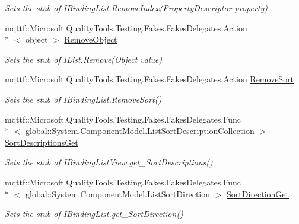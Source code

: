 \begin{DoxyCompactItemize}
\begin{DoxyCompactList}\small\item\em Sets the stub of I\-Binding\-List.\-Remove\-Index(\-Property\-Descriptor property)\end{DoxyCompactList}\item 
mqttf\-::\-Microsoft.\-Quality\-Tools.\-Testing.\-Fakes.\-Fakes\-Delegates.\-Action\\*
$<$ object $>$ \hyperlink{class_system_1_1_component_model_1_1_fakes_1_1_stub_i_binding_list_view_a52741de6b144fa468048a244bdeb375b}{Remove\-Object}
\begin{DoxyCompactList}\small\item\em Sets the stub of I\-List.\-Remove(\-Object value)\end{DoxyCompactList}\item 
mqttf\-::\-Microsoft.\-Quality\-Tools.\-Testing.\-Fakes.\-Fakes\-Delegates.\-Action \hyperlink{class_system_1_1_component_model_1_1_fakes_1_1_stub_i_binding_list_view_a1dfd832062d6b5c48afb4a58b2f05fe1}{Remove\-Sort}
\begin{DoxyCompactList}\small\item\em Sets the stub of I\-Binding\-List.\-Remove\-Sort()\end{DoxyCompactList}\item 
mqttf\-::\-Microsoft.\-Quality\-Tools.\-Testing.\-Fakes.\-Fakes\-Delegates.\-Func\\*
$<$ global\-::\-System.\-Component\-Model.\-List\-Sort\-Description\-Collection $>$ \hyperlink{class_system_1_1_component_model_1_1_fakes_1_1_stub_i_binding_list_view_add9f97f89fabd1397b75c1fe844fc740}{Sort\-Descriptions\-Get}
\begin{DoxyCompactList}\small\item\em Sets the stub of I\-Binding\-List\-View.\-get\-\_\-\-Sort\-Descriptions()\end{DoxyCompactList}\item 
mqttf\-::\-Microsoft.\-Quality\-Tools.\-Testing.\-Fakes.\-Fakes\-Delegates.\-Func\\*
$<$ global\-::\-System.\-Component\-Model.\-List\-Sort\-Direction $>$ \hyperlink{class_system_1_1_component_model_1_1_fakes_1_1_stub_i_binding_list_view_a0b5a5ec8efddeea35a6ce0875dc62f0c}{Sort\-Direction\-Get}
\begin{DoxyCompactList}\small\item\em Sets the stub of I\-Binding\-List.\-get\-\_\-\-Sort\-Direction()\end{DoxyCompactList}\item 

\end{DoxyCompactItemize}
